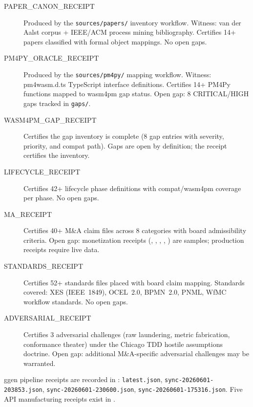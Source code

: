 \begin{description}
  \item[PAPER\_CANON\_RECEIPT]
        Produced by the \texttt{sources/papers/} inventory workflow. Witness: van der Aalst
        corpus + IEEE/ACM process mining bibliography. Certifies 14+ papers classified with
        formal object mappings. No open gaps.

  \item[PM4PY\_ORACLE\_RECEIPT]
        Produced by the \texttt{sources/pm4py/} mapping workflow. Witness: pm4wasm.d.ts
        TypeScript interface definitions. Certifies 14+ PM4Py functions mapped to wasm4pm
        gap status. Open gap: 8 CRITICAL/HIGH gaps tracked in \texttt{gaps/}.

  \item[WASM4PM\_GAP\_RECEIPT]
        Certifies the gap inventory is complete (8 gap entries with severity, priority, and
        compat path). Gaps are open by definition; the receipt certifies the inventory.

  \item[LIFECYCLE\_RECEIPT]
        Certifies 42+ lifecycle phase definitions with compat/wasm4pm coverage per phase.
        No open gaps.

  \item[MA\_RECEIPT]
        Certifies 40+ M\&A claim files across 8 categories with board admissibility
        criteria. Open gap: monetization receipts (,
        , ,
        , )
        are samples; production receipts require live data.

  \item[STANDARDS\_RECEIPT]
        Certifies 52+ standards files placed with board claim mapping. Standards covered:
        XES (IEEE~1849), OCEL~2.0, BPMN~2.0, PNML, WfMC workflow standards. No open gaps.

  \item[ADVERSARIAL\_RECEIPT]
        Certifies 3 adversarial challenges (raw laundering, metric fabrication, conformance
        theater) under the Chicago TDD hostile assumptions doctrine. Open gap: additional
        M\&A-specific adversarial challenges may be warranted.
\end{description}

ggen pipeline receipts are recorded in :
\texttt{latest.json}, \texttt{sync-20260601-203853.json},
\texttt{sync-20260601-230600.json}, \texttt{sync-20260601-175316.json}.
Five API manufacturing receipts exist in
.

